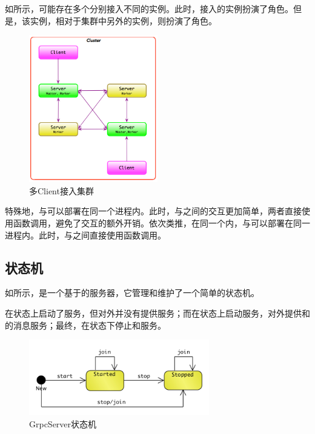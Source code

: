\begin{content}
如所示，可能存在多个分别接入不同的实例。此时，接入的实例扮演了角色。但是，该实例，相对于集群中另外的实例，则扮演了角色。

\begin{figure}[H]
\centering
\includegraphics[width=0.5\textwidth]{figures/cc-server-interact-2.png}
\caption{多Client接入集群}
 \label{fig:cc-server-interact-2}
\end{figure}

特殊地，与可以部署在同一个进程内。此时，与之间的交互更加简单，两者直接使用函数调用，避免了交互的额外开销。依次类推，在同一个内，与可以部署在同一进程内。此时，与之间直接使用函数调用。

\subsection{状态机}

如所示，是一个基于的服务器，它管理和维护了一个简单的状态机。

在状态上启动了服务，但对外并没有提供服务；而在状态上启动服务，对外提供和的消息服务；最终，在状态下停止和服务。

\begin{figure}[H]
\centering
\includegraphics[width=0.7\textwidth]{figures/dist-grpc-server-state-machine.png}
\caption{GrpcServer状态机}
 \label{fig:dist-grpc-server-state-machine}
\end{figure}


\end{content}
